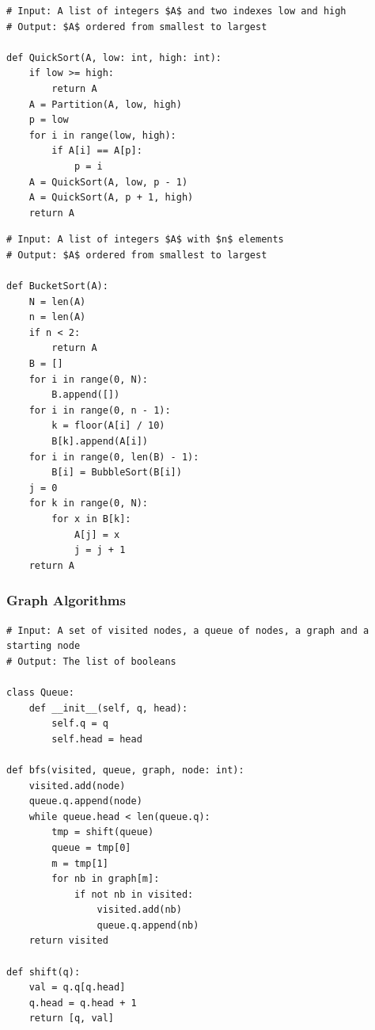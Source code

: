 \begin{lstlisting}[caption={The result of transpiling \Cref{quickSortGourmet} to Python.}, captionpos=b, label={quickSortPython}]
# Input: A list of integers $A$ and two indexes low and high
# Output: $A$ ordered from smallest to largest

def QuickSort(A, low: int, high: int):
    if low >= high:
        return A
    A = Partition(A, low, high)
    p = low
    for i in range(low, high):
        if A[i] == A[p]:
            p = i
    A = QuickSort(A, low, p - 1)
    A = QuickSort(A, p + 1, high)
    return A
\end{lstlisting}

\begin{lstlisting}[caption={The result of transpiling \Cref{bucketSortGourmet} to Python.}, captionpos=b, label={bucketSortPython}]
# Input: A list of integers $A$ with $n$ elements
# Output: $A$ ordered from smallest to largest

def BucketSort(A):
    N = len(A)
    n = len(A)
    if n < 2:
        return A
    B = []
    for i in range(0, N):
        B.append([])
    for i in range(0, n - 1):
        k = floor(A[i] / 10)
        B[k].append(A[i])
    for i in range(0, len(B) - 1):
        B[i] = BubbleSort(B[i])
    j = 0
    for k in range(0, N):
        for x in B[k]:
            A[j] = x
            j = j + 1
    return A
\end{lstlisting}

\subsubsection{Graph Algorithms}

\begin{lstlisting}[caption={The result of transpiling \Cref{bfsGourmet} to Python.}, captionpos=b, label={bfsPython}]
# Input: A set of visited nodes, a queue of nodes, a graph and a starting node
# Output: The list of booleans

class Queue:
    def __init__(self, q, head):
        self.q = q
        self.head = head

def bfs(visited, queue, graph, node: int):
    visited.add(node)
    queue.q.append(node)
    while queue.head < len(queue.q):
        tmp = shift(queue)
        queue = tmp[0]
        m = tmp[1]
        for nb in graph[m]:
            if not nb in visited:
                visited.add(nb)
                queue.q.append(nb)
    return visited

def shift(q):
    val = q.q[q.head]
    q.head = q.head + 1
    return [q, val]
\end{lstlisting}

